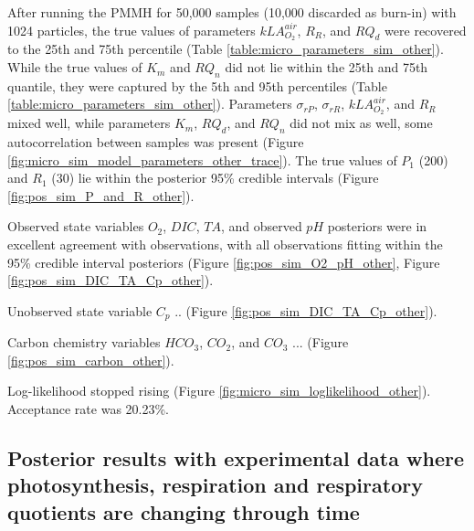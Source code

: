 \documentclass{ruthesis}
\begin{document}
After running the PMMH for 50,000 samples (10,000 discarded as burn-in) with 1024 particles, the true values of parameters $kLA_{O_2}^{air}$, $R_R$, and $RQ_d$ were recovered to the 25th and 75th percentile (Table \ref{table:micro_parameters_sim_other}). While the true values of $K_m$ and $RQ_n$ did not lie within the 25th and 75th quantile, they were captured by the 5th and 95th percentiles (Table \ref{table:micro_parameters_sim_other}). 
Parameters $\sigma_{rP}$, $\sigma_{rR}$, $kLA_{O_2}^{air}$, and $R_R$ mixed well, while parameters $K_m$, $RQ_d$, and $RQ_n$ did not mix as well, some autocorrelation between samples was present (Figure \ref{fig:micro_sim_model_parameters_other_trace}). The true values of $P_1$ (200) and $R_1$ (30) lie within the posterior 95\% credible intervals
(Figure \ref{fig:pos_sim_P_and_R_other}).

Observed state variables $O_2$, $DIC$, $TA$, and observed $pH$ posteriors were in excellent agreement with observations, with all observations fitting within the 95\% credible interval posteriors (Figure \ref{fig:pos_sim_O2_pH_other}, Figure \ref{fig:pos_sim_DIC_TA_Cp_other}).


Unobserved state variable $C_p$ .. (Figure \ref{fig:pos_sim_DIC_TA_Cp_other}).

Carbon chemistry variables $HCO_3$, $CO_2$, and $CO_3$ ... (Figure \ref{fig:pos_sim_carbon_other}).


Log-likelihood stopped rising (Figure \ref{fig:micro_sim_loglikelihood_other}).
Acceptance rate was 20.23\%.

\FloatBarrier
\subsection{Posterior results with experimental data where photosynthesis, respiration and respiratory quotients are changing through time}
\end{document}
